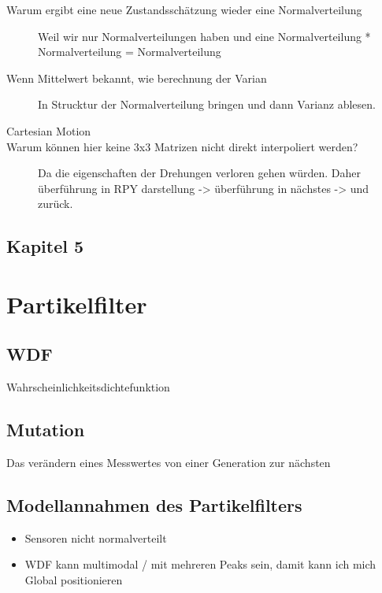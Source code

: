 \begin{description}
	\item[Warum ergibt eine neue Zustandsschätzung wieder eine Normalverteilung] Weil wir nur Normalverteilungen haben und eine Normalverteilung * Normalverteilung = Normalverteilung
	\item[Wenn Mittelwert bekannt, wie berechnung der Varian] In Strucktur der Normalverteilung bringen und dann Varianz ablesen.
	\item[Cartesian Motion] 
	\item[Warum können hier keine 3x3 Matrizen nicht direkt interpoliert werden?] Da die eigenschaften der Drehungen verloren gehen würden. Daher überführung in RPY darstellung -> überführung in nächstes -> und zurück.
\end{description} 

\section{Kapitel 5}
\label{sec:faq:kap5}

\newpage

\chapter{Partikelfilter}
\label{kap6Partikelfilter}


	
	\section{WDF}
	Wahrscheinlichkeitsdichtefunktion \cite{wdf}
	
	\section{Mutation}
	Das verändern eines Messwertes von einer Generation zur nächsten
	
	\section{Modellannahmen des Partikelfilters}
	
	\begin{itemize}
		\item Sensoren nicht normalverteilt
		\item WDF kann multimodal / mit mehreren Peaks sein, damit kann ich mich Global positionieren
	\end{itemize}
	


